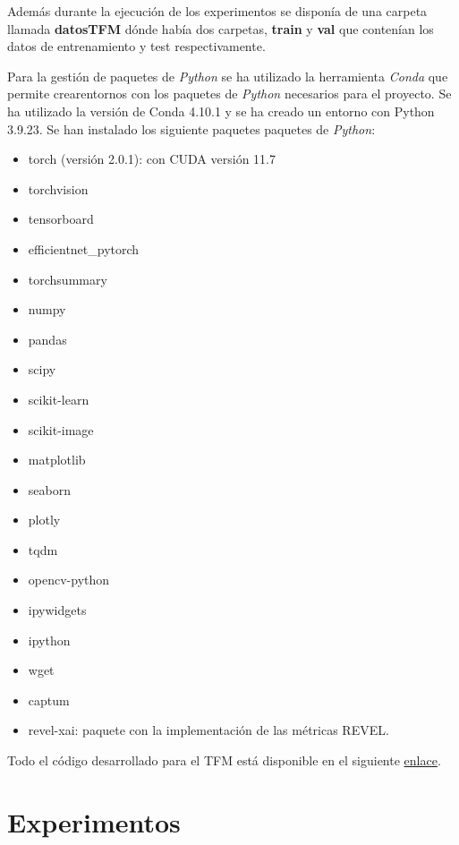Además durante la ejecución de los experimentos se disponía de una carpeta llamada \textbf{datosTFM} dónde había dos carpetas, \textbf{train} y \textbf{val} que contenían los datos de entrenamiento y test respectivamente.

Para la gestión de paquetes de \textit{Python} se ha utilizado la herramienta \textit{Conda} que permite crearentornos con los paquetes de \textit{Python} necesarios para el proyecto. Se ha utilizado la versión de Conda 4.10.1 y se ha creado un entorno con Python 3.9.23. Se han instalado los siguiente paquetes paquetes de \textit{Python}:

\begin{itemize}
    \item torch (versión 2.0.1): con CUDA versión 11.7
    \item torchvision
    \item tensorboard
    \item efficientnet\_pytorch
    \item torchsummary
    \item numpy
    \item pandas
    \item scipy
    \item scikit-learn
    \item scikit-image
    \item matplotlib
    \item seaborn
    \item plotly
    \item tqdm
    \item opencv-python
    \item ipywidgets
    \item ipython
    \item wget
    \item captum
    \item revel-xai: paquete con la implementación de las métricas REVEL.
\end{itemize}

Todo el código desarrollado para el TFM está disponible en el siguiente \href{https://github.com/CarlosLaraCasanova/Codigo_TFM/tree/main}{enlace}.


\clearpage


\newpage
\chapter{Experimentos} \label{cap:exp}



